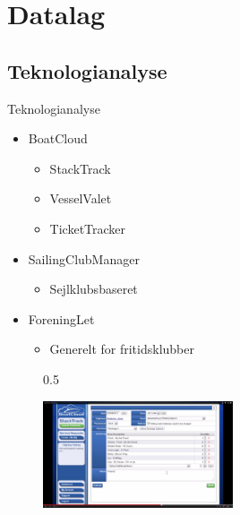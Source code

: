 \section{Datalag}
\subsection{Teknologianalyse}

\begin{frame}{Teknologianalyse}
  \begin{itemize}
    \item BoatCloud
    \begin{itemize}
      \item StackTrack
      \item VesselValet
      \item TicketTracker
    \end{itemize}
    \item SailingClubManager
    \begin{itemize}
      \item Sejlklubsbaseret
    \end{itemize}
    \item ForeningLet
    \begin{itemize}
      \item Generelt for fritidsklubber
    \end{itemize}
  \end{itemize}
  \begin{figure}{0.5\textwidth}
    
    \vspace{-30pt}
    \begin{center}
        \includegraphics[width=0.5\textwidth]{images/StackTrack.jpg}
    \end{center}
    \vspace{-15pt}
    \vspace{-15pt}
\end{figure}
\end{frame}


